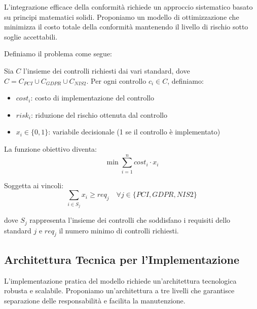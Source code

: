 L'integrazione efficace della conformità richiede un approccio sistematico basato su principi matematici solidi. Proponiamo un modello di ottimizzazione che minimizza il costo totale della conformità mantenendo il livello di rischio sotto soglie accettabili.

Definiamo il problema come segue:

Sia $C$ l'insieme dei controlli richiesti dai vari standard, dove $C = C_{PCI} \cup C_{GDPR} \cup C_{NIS2}$. Per ogni controllo $c_i \in C$, definiamo:
\begin{itemize}
    \item $cost_i$: costo di implementazione del controllo
    \item $risk_i$: riduzione del rischio ottenuta dal controllo
    \item $x_i \in \{0,1\}$: variabile decisionale (1 se il controllo è implementato)
\end{itemize}

La funzione obiettivo diventa:
\begin{equation}
\min \sum_{i=1}^{n} cost_i \cdot x_i
\end{equation}

Soggetta ai vincoli:
\begin{equation}
\sum_{i \in S_j} x_i \geq req_j \quad \forall j \in \{PCI, GDPR, NIS2\}
\end{equation}

dove $S_j$ rappresenta l'insieme dei controlli che soddisfano i requisiti dello standard $j$ e $req_j$ il numero minimo di controlli richiesti.

\subsection{\texorpdfstring{Architettura Tecnica per l'Implementazione}{4.3.2 - Architettura Tecnica per l'Implementazione}}
\label{subsec:4.3.2_architettura}

L'implementazione pratica del modello richiede un'architettura tecnologica robusta e scalabile. Proponiamo un'architettura a tre livelli che garantisce separazione delle responsabilità e facilita la manutenzione.

